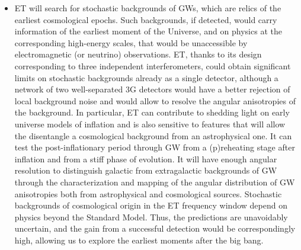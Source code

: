 \begin{itemize}
\item ET will search for stochastic backgrounds of GWs, which are relics of the earliest cosmological epochs. 
Such backgrounds, if detected, would carry information of the earliest moment of the Universe, and on physics at the corresponding high-energy scales, that would be unaccessible  by electromagnetic (or neutrino) observations. ET, thanks to its design corresponding to three independent interferometers, could obtain significant limits on stochastic backgrounds already as a single detector, although  a network of two well-separated 3G detectors  would have a better rejection of local background noise and would allow to resolve the angular anisotropies of the background.
In particular,  ET can contribute to shedding light on early universe models of inflation and is also sensitive to features that will allow the disentangle a cosmological background from an astrophysical one. It can test the post-inflationary period through GW from a (p)reheating stage after inflation and from a stiff phase of evolution. It  will have enough angular resolution to distinguish galactic from extragalactic backgrounds of GW through the characterization and mapping of the angular distribution of GW anisotropies both from astrophysical and cosmological sources.  
Stochastic backgrounds of cosmological origin in the ET frequency window depend on physics beyond the Standard Model. Thus, the  predictions are unavoidably uncertain, and the gain from a successful detection would be correspondingly high, allowing us to explore the earliest moments after the big bang.


\end{itemize}


